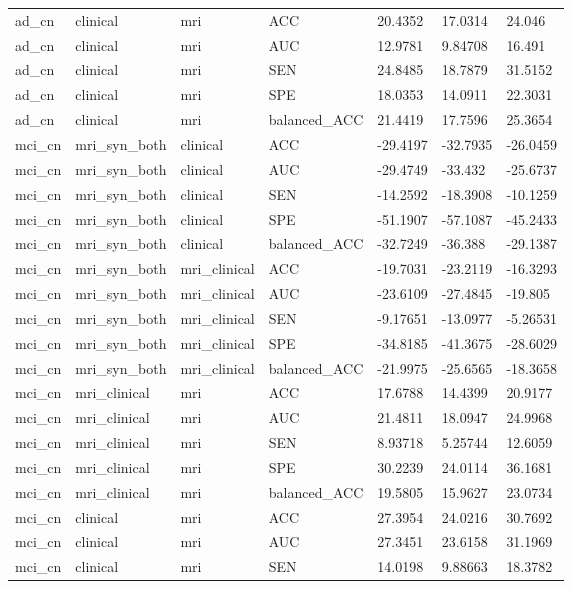 \documentclass{article}
\begin{document}
\begin{landscape}
\begin{longtable}{lllllll}
ad\_cn & clinical & mri & ACC & 20.4352 & 17.0314 & 24.046 \\
ad\_cn & clinical & mri & AUC & 12.9781 & 9.84708 & 16.491 \\
ad\_cn & clinical & mri & SEN & 24.8485 & 18.7879 & 31.5152 \\
ad\_cn & clinical & mri & SPE & 18.0353 & 14.0911 & 22.3031 \\
ad\_cn & clinical & mri & balanced\_ACC & 21.4419 & 17.7596 & 25.3654 \\
mci\_cn & mri\_syn\_both & clinical & ACC & -29.4197 & -32.7935 & -26.0459 \\
mci\_cn & mri\_syn\_both & clinical & AUC & -29.4749 & -33.432 & -25.6737 \\
mci\_cn & mri\_syn\_both & clinical & SEN & -14.2592 & -18.3908 & -10.1259 \\
mci\_cn & mri\_syn\_both & clinical & SPE & -51.1907 & -57.1087 & -45.2433 \\
mci\_cn & mri\_syn\_both & clinical & balanced\_ACC & -32.7249 & -36.388 & -29.1387 \\
mci\_cn & mri\_syn\_both & mri\_clinical & ACC & -19.7031 & -23.2119 & -16.3293 \\
mci\_cn & mri\_syn\_both & mri\_clinical & AUC & -23.6109 & -27.4845 & -19.805 \\
mci\_cn & mri\_syn\_both & mri\_clinical & SEN & -9.17651 & -13.0977 & -5.26531 \\
mci\_cn & mri\_syn\_both & mri\_clinical & SPE & -34.8185 & -41.3675 & -28.6029 \\
mci\_cn & mri\_syn\_both & mri\_clinical & balanced\_ACC & -21.9975 & -25.6565 & -18.3658 \\
mci\_cn & mri\_clinical & mri & ACC & 17.6788 & 14.4399 & 20.9177 \\
mci\_cn & mri\_clinical & mri & AUC & 21.4811 & 18.0947 & 24.9968 \\
mci\_cn & mri\_clinical & mri & SEN & 8.93718 & 5.25744 & 12.6059 \\
mci\_cn & mri\_clinical & mri & SPE & 30.2239 & 24.0114 & 36.1681 \\
mci\_cn & mri\_clinical & mri & balanced\_ACC & 19.5805 & 15.9627 & 23.0734 \\
mci\_cn & clinical & mri & ACC & 27.3954 & 24.0216 & 30.7692 \\
mci\_cn & clinical & mri & AUC & 27.3451 & 23.6158 & 31.1969 \\
mci\_cn & clinical & mri & SEN & 14.0198 & 9.88663 & 18.3782 \\

\end{longtable}
\end{landscape}
\end{document}
